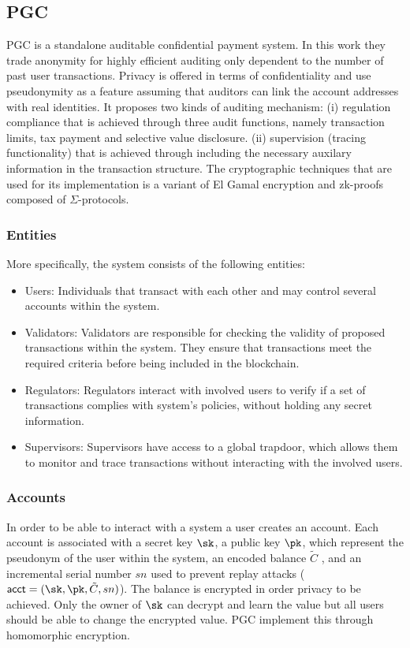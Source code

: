 \subsection{PGC}

PGC \cite{PGC} is a standalone auditable confidential payment system. In this work they trade anonymity for highly efficient auditing only dependent to the number of past user transactions. Privacy is offered in terms of confidentiality and use pseudonymity as a feature assuming that auditors can link the account addresses with real identities. It proposes two kinds of auditing mechanism: (i) regulation compliance that is achieved through three audit functions, namely transaction limits, tax payment and selective value disclosure. (ii) supervision (tracing functionality) that is achieved through including the necessary auxilary information in the transaction structure. The cryptographic techniques that are used for its implementation is a variant of El Gamal encryption and zk-proofs composed of $\Sigma$-protocols.

\subsubsection{Entities}
More specifically, the system consists of the following entities:
\begin{itemize}
    \item Users: Individuals that transact with each other and may control several accounts within the system.

    \item Validators: Validators are responsible for checking the validity of proposed transactions within the system. They ensure that transactions meet the required criteria before being included in the blockchain.
    
    \item Regulators: Regulators interact with involved users to verify if a set of transactions complies with system's policies, without holding any secret information.
    
    \item Supervisors: Supervisors have access to a global trapdoor, which allows them to monitor and trace transactions without interacting with the involved users. 
\end{itemize}

\subsubsection{Accounts}
In order to be able to interact with a system a user creates an account. Each account is associated with a secret key $\sk$, a public key $\pk$, which represent the pseudonym of the user within the system, an encoded balance $\tilde{C}$ , and an incremental serial number $sn$ used to prevent replay attacks ($ \acct = (\sk, \pk, \tilde{C}, sn)$). The balance is encrypted in order privacy to be achieved. Only the owner of $\sk$ can decrypt and learn the value but all users should be able to change the encrypted value. PGC implement this through homomorphic encryption.

